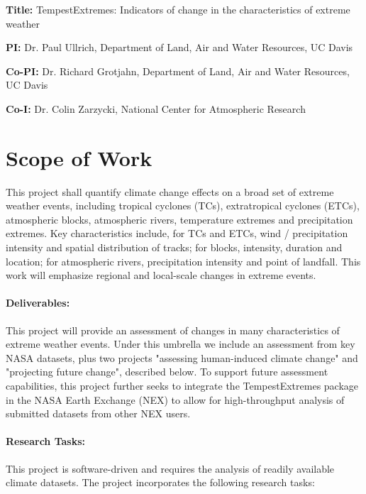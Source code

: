 \documentclass[11pt]{article}
\begin{document}
\textbf{Title:} TempestExtremes: Indicators of change in the characteristics of extreme weather

\textbf{PI:} Dr. Paul Ullrich, Department of Land, Air and Water Resources, UC Davis

\textbf{Co-PI:}  Dr. Richard Grotjahn, Department of Land, Air and Water Resources, UC Davis

\textbf{Co-I:} Dr. Colin Zarzycki, National Center for Atmospheric Research



\section{Scope of Work}
This project shall quantify climate change effects on a broad set of extreme weather events, including tropical cyclones (TCs), extratropical cyclones (ETCs), atmospheric blocks, atmospheric rivers, temperature extremes and precipitation extremes. Key characteristics include, for TCs and ETCs, wind / precipitation intensity and spatial distribution of tracks; for blocks, intensity, duration and location; for atmospheric rivers, precipitation intensity and point of landfall. This work will emphasize regional and local-scale changes in extreme events.

\paragraph{Deliverables:}  This project will provide an assessment of changes in many characteristics of extreme weather events.  Under this umbrella we include an assessment from key NASA datasets, plus two projects "assessing human-induced climate change" and "projecting future change", described below.  To support future assessment capabilities, this project further seeks to integrate the TempestExtremes package in the NASA Earth Exchange (NEX) to allow for high-throughput analysis of submitted datasets from other NEX users.

\paragraph{Research Tasks:}  This project is software-driven and requires the analysis of readily available climate datasets.  The project incorporates the following research tasks:
\end{document}
